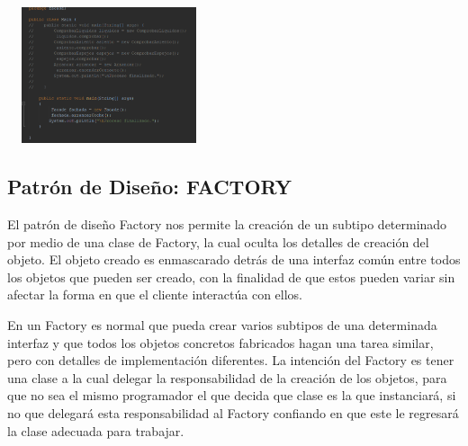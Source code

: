 \documentclass[twoside,twocolumn]{article}
\begin{document}
\begin{itemize}
\includegraphics[width=6cm, height=4cm]{imagenes/faca6.png}



\end{itemize}

\subsection{Patrón de Diseño: FACTORY}
El patrón de diseño Factory nos permite la creación de un subtipo determinado por medio de una clase de Factory, la cual oculta los detalles de creación del objeto.
El objeto creado es enmascarado detrás de una interfaz común entre todos los objetos que pueden ser creado, con la finalidad de que estos pueden variar sin afectar la forma en que el cliente interactúa con ellos. 

En un Factory es normal que pueda crear varios subtipos de una determinada interfaz y que todos los objetos concretos fabricados hagan una tarea similar, pero con detalles de implementación diferentes. La intención 
del Factory es tener una clase a la cual delegar la responsabilidad de la creación de los objetos, para que no sea el mismo programador el que decida que clase es la que instanciará, si no que delegará esta responsabilidad 
al Factory confiando en que este le regresará la clase adecuada para trabajar.
\end{document}

